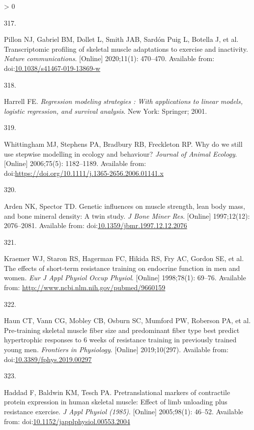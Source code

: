 \documentclass[twoside,10pt]{gihclass} %
\newlength{\cslhangindent}
\newlength{\csllabelwidth}
\newenvironment{CSLReferences}[3] %
 {%
  \setlength{\parindent}{0pt}
  \ifodd #1 \everypar{\setlength{\hangindent}{\cslhangindent}}\ignorespaces\fi
  \ifnum #2 > 0
  \setlength{\parskip}{#2\baselineskip}
  \fi
 }%
 {}
\newcommand{\CSLLeftMargin}[1]{\parbox[t]{\maxof{\widthof{#1}}{\csllabelwidth}}{#1}}
\newcommand{\CSLRightInline}[1]{\parbox[t]{\linewidth}{#1}}
\begin{document}
\begin{CSLReferences}{0}{0}
\leavevmode\hypertarget{ref-RN2360}{}%
\CSLLeftMargin{317. }
\CSLRightInline{Pillon NJ, Gabriel BM, Dollet L, Smith JAB, Sardón Puig L, Botella J, et al. Transcriptomic profiling of skeletal muscle adaptations to exercise and inactivity. \emph{Nature communications}. {[}Online{]} 2020;11(1): 470--470. Available from: doi:\href{https://doi.org/10.1038/s41467-019-13869-w}{10.1038/s41467-019-13869-w}}

\leavevmode\hypertarget{ref-RN2881}{}%
\CSLLeftMargin{318. }
\CSLRightInline{Harrell FE. \emph{Regression modeling strategies : With applications to linear models, logistic regression, and survival analysis}. New York: Springer; 2001. }

\leavevmode\hypertarget{ref-RN2882}{}%
\CSLLeftMargin{319. }
\CSLRightInline{Whittingham MJ, Stephens PA, Bradbury RB, Freckleton RP. Why do we still use stepwise modelling in ecology and behaviour? \emph{Journal of Animal Ecology}. {[}Online{]} 2006;75(5): 1182--1189. Available from: doi:\url{https://doi.org/10.1111/j.1365-2656.2006.01141.x}}

\leavevmode\hypertarget{ref-RN2884}{}%
\CSLLeftMargin{320. }
\CSLRightInline{Arden NK, Spector TD. Genetic influences on muscle strength, lean body mass, and bone mineral density: A twin study. \emph{J Bone Miner Res}. {[}Online{]} 1997;12(12): 2076--2081. Available from: doi:\href{https://doi.org/10.1359/jbmr.1997.12.12.2076}{10.1359/jbmr.1997.12.12.2076}}

\leavevmode\hypertarget{ref-RN166}{}%
\CSLLeftMargin{321. }
\CSLRightInline{Kraemer WJ, Staron RS, Hagerman FC, Hikida RS, Fry AC, Gordon SE, et al. The effects of short-term resistance training on endocrine function in men and women. \emph{Eur J Appl Physiol Occup Physiol}. {[}Online{]} 1998;78(1): 69--76. Available from: \url{http://www.ncbi.nlm.nih.gov/pubmed/9660159}}

\leavevmode\hypertarget{ref-RN2225}{}%
\CSLLeftMargin{322. }
\CSLRightInline{Haun CT, Vann CG, Mobley CB, Osburn SC, Mumford PW, Roberson PA, et al. Pre-training skeletal muscle fiber size and predominant fiber type best predict hypertrophic responses to 6 weeks of resistance training in previously trained young men. \emph{Frontiers in Physiology}. {[}Online{]} 2019;10(297). Available from: doi:\href{https://doi.org/10.3389/fphys.2019.00297}{10.3389/fphys.2019.00297}}

\leavevmode\hypertarget{ref-RN2180}{}%
\CSLLeftMargin{323. }
\CSLRightInline{Haddad F, Baldwin KM, Tesch PA. Pretranslational markers of contractile protein expression in human skeletal muscle: Effect of limb unloading plus resistance exercise. \emph{J Appl Physiol (1985)}. {[}Online{]} 2005;98(1): 46--52. Available from: doi:\href{https://doi.org/10.1152/japplphysiol.00553.2004}{10.1152/japplphysiol.00553.2004}}


\end{CSLReferences}
\end{document}
